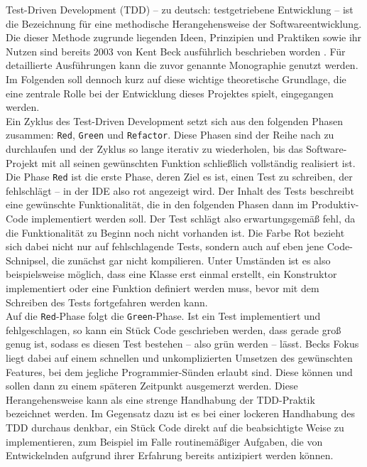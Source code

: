 
Test-Driven Development (TDD) -- zu deutsch: testgetriebene Entwicklung -- ist die 
Bezeichnung für eine methodische Herangehensweise der Softwareentwicklung. Die dieser 
Methode zugrunde liegenden Ideen, Prinzipien und Praktiken sowie ihr Nutzen sind bereits 
2003 von Kent Beck ausführlich beschrieben worden \cite{beck2003tdd}. Für detaillierte 
Ausführungen kann die zuvor genannte Monographie genutzt werden. Im Folgenden soll 
dennoch kurz auf diese wichtige theoretische Grundlage, die eine zentrale Rolle bei der 
Entwicklung dieses Projektes spielt, eingegangen werden. \\ 
Ein Zyklus des Test-Driven Development setzt sich aus den folgenden Phasen zusammen: 
\texttt{Red}, \texttt{Green} und \texttt{Refactor}. Diese Phasen sind der Reihe nach zu 
durchlaufen und der Zyklus so lange iterativ zu wiederholen, bis das Software-Projekt 
mit all seinen gewünschten Funktion schließlich vollständig realisiert ist. \\ 
Die Phase \texttt{Red} ist die erste Phase, deren Ziel es ist, einen Test zu schreiben, 
der fehlschlägt -- in der IDE also rot angezeigt wird. Der Inhalt des Tests beschreibt 
eine gewünschte Funktionalität, die in den folgenden Phasen dann im Produktiv-Code 
implementiert werden soll. Der Test schlägt also erwartungsgemäß fehl, da die 
Funktionalität zu Beginn noch nicht vorhanden ist. Die Farbe Rot bezieht sich dabei 
nicht nur auf fehlschlagende Tests, sondern auch auf eben jene Code-Schnipsel, die 
zunächst gar nicht kompilieren. Unter Umständen ist es also beispielsweise möglich, dass 
eine Klasse erst einmal erstellt, ein Konstruktor implementiert oder eine Funktion 
definiert werden muss, bevor mit dem Schreiben des Tests fortgefahren werden kann. \\ 
Auf die \texttt{Red}-Phase folgt die \texttt{Green}-Phase. Ist ein Test implementiert 
und fehlgeschlagen, so kann ein Stück Code geschrieben werden, dass gerade groß genug 
ist, sodass es diesen Test bestehen -- also grün werden -- lässt. Becks Fokus liegt 
dabei auf einem schnellen und unkomplizierten Umsetzen des gewünschten Features, bei dem 
jegliche Programmier-Sünden erlaubt sind. Diese können und sollen dann zu einem späteren 
Zeitpunkt ausgemerzt werden. Diese Herangehensweise kann als eine strenge 
Handhabung der TDD-Praktik bezeichnet werden. Im Gegensatz dazu ist es bei einer 
lockeren Handhabung des TDD durchaus denkbar, ein Stück Code direkt auf die 
beabsichtigte Weise zu implementieren, zum Beispiel im Falle routinemäßiger Aufgaben, 
die von Entwickelnden aufgrund ihrer Erfahrung bereits antizipiert werden können.

